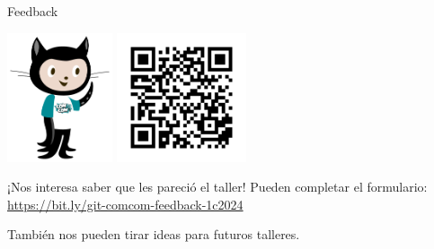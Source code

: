 \begin{frame}{Feedback}

    \begin{center}
        \includegraphics[height=1.5in]{images/octocat-comcom.pdf}
        \includegraphics[height=1.5in]{images/feedback-24c2.png}
    \end{center}

    \begin{block}{¡Nos interesa saber que les pareció el taller!}
        Pueden completar el formulario: \url{https://bit.ly/git-comcom-feedback-1c2024}

        \vspace{0.5em}

        También nos pueden tirar ideas para futuros talleres.
    \end{block}

\end{frame}
